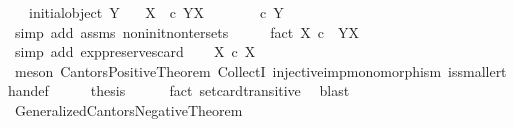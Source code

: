 \begin{isabellebody}
\ \ \ {\isachardoublequoteopen}{\isasymnot}{\isacharparenleft}{\kern0pt}initial{\isacharunderscore}{\kern0pt}object\ Y{\isacharparenright}{\kern0pt}{\isachardoublequoteclose}\isanewline
\ \ \ {\isachardoublequoteopen}X\ \ {\isasymle}\isactrlsub c\ Y\isactrlbsup X\isactrlesup {\isachardoublequoteclose}\isanewline
%
\isadelimproof
%
\endisadelimproof
%
\isatagproof
{}\isamarkupfalse%
\ {\isacharminus}{\kern0pt}\ \isanewline
\ \ \isamarkupfalse%
\ {\isachardoublequoteopen}{\isasymOmega}\ {\isasymle}\isactrlsub c\ Y{\isachardoublequoteclose}\isanewline
\ \ \ \ \isamarkupfalse%
\ {\isacharparenleft}{\kern0pt}simp\ add{\isacharcolon}{\kern0pt}\ assms\ non{\isacharunderscore}{\kern0pt}init{\isacharunderscore}{\kern0pt}non{\isacharunderscore}{\kern0pt}ter{\isacharunderscore}{\kern0pt}sets{\isacharparenright}{\kern0pt}\isanewline
\ \ \isamarkupfalse%
\ \isamarkupfalse%
\ fact{\isacharcolon}{\kern0pt}\ {\isachardoublequoteopen}{\isasymOmega}\isactrlbsup X\isactrlesup \ {\isasymle}\isactrlsub c\ \ Y\isactrlbsup X\isactrlesup {\isachardoublequoteclose}\isanewline
\ \ \ \ \isamarkupfalse%
\ {\isacharparenleft}{\kern0pt}simp\ add{\isacharcolon}{\kern0pt}\ exp{\isacharunderscore}{\kern0pt}preserves{\isacharunderscore}{\kern0pt}card{}{\isacharparenright}{\kern0pt}\isanewline
\ \ \isamarkupfalse%
\ {\isachardoublequoteopen}X\ {\isasymle}\isactrlsub c\ {\isasymOmega}\isactrlbsup X\isactrlesup {\isachardoublequoteclose}\isanewline
\ \ \ \ \isamarkupfalse%
\ {\isacharparenleft}{\kern0pt}meson\ Cantors{\isacharunderscore}{\kern0pt}Positive{\isacharunderscore}{\kern0pt}Theorem\ CollectI\ injective{\isacharunderscore}{\kern0pt}imp{\isacharunderscore}{\kern0pt}monomorphism\ is{\isacharunderscore}{\kern0pt}smaller{\isacharunderscore}{\kern0pt}than{\isacharunderscore}{\kern0pt}def{\isacharparenright}{\kern0pt}\isanewline
\ \ \isamarkupfalse%
\ \isamarkupfalse%
\ {\isacharquery}{\kern0pt}thesis\isanewline
\ \ \ \ \isamarkupfalse%
\ fact\ set{\isacharunderscore}{\kern0pt}card{\isacharunderscore}{\kern0pt}transitive\ \isamarkupfalse%
\ blast\isanewline
{}\isamarkupfalse%
%
\endisatagproof
{\isafoldproof}%
%
\isadelimproof
\isanewline
%
\endisadelimproof
\isanewline
{}\isamarkupfalse%
\ Generalized{\isacharunderscore}{\kern0pt}Cantors{\isacharunderscore}{\kern0pt}Negative{\isacharunderscore}{\kern0pt}Theorem{\isacharcolon}{\kern0pt}\isanewline

\end{isabellebody}
